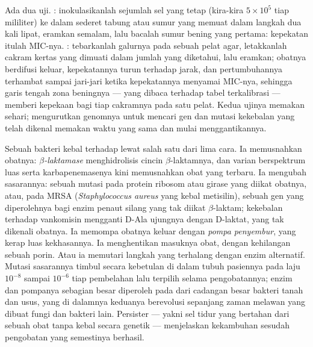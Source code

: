 \begin{method}\label{met:b3:bacteriology:mic}
Ada dua uji. \emph{}: inokulasikanlah sejumlah sel yang tetap
(kira-kira $5\times 10^{5}$ tiap mililiter) ke dalam sederet tabung atau sumur
yang memuat  dalam langkah dua kali lipat, eramkan semalam, lalu
bacalah sumur bening yang pertama: kepekatan itulah MIC-nya. \emph{}: tebarkanlah galurnya pada sebuah pelat agar, letakkanlah cakram kertas
yang dimuati  dalam jumlah yang diketahui, lalu eramkan; obatnya
berdifusi keluar, kepekatannya turun terhadap jarak, dan pertumbuhannya
terhambat sampai jari-jari ketika kepekatannya menyamai MIC-nya, sehingga garis
tengah zona beningnya --- yang dibaca terhadap tabel terkalibrasi --- memberi
kepekaan bagi tiap cakramnya pada satu pelat. Kedua ujinya memakan sehari;
mengurutkan genomnya untuk mencari gen dan mutasi kekebalan yang telah dikenal
memakan waktu yang sama dan mulai menggantikannya.
\end{method}

\begin{definition}[Kekebalan]\label{def:b3:bacteriology:resistance}
Sebuah bakteri kebal terhadap  lewat salah satu dari lima cara. Ia
memusnahkan obatnya: \emph{$\beta$-laktamase} menghidrolisis cincin
$\beta$-laktamnya, dan varian berspektrum luas serta karbapenemasenya kini
memusnahkan obat yang terbaru. Ia mengubah sasarannya: sebuah mutasi pada
protein ribosom atau girase yang diikat obatnya, atau, pada MRSA
(\emph{Staphylococcus aureus} yang kebal metisilin), sebuah gen yang
diperolehnya bagi enzim penaut silang yang tak diikat $\beta$-laktam;
kekebalan terhadap vankomisin mengganti D-Ala ujungnya dengan D-laktat, yang
tak dikenali obatnya. Ia memompa obatnya keluar dengan \emph{pompa penyembur},
yang kerap luas kekhasannya. Ia menghentikan masuknya obat, dengan kehilangan
sebuah porin. Atau ia memutari langkah yang terhalang dengan enzim alternatif.
Mutasi sasarannya timbul secara kebetulan di dalam tubuh pasiennya pada laju
$10^{-8}$ sampai $10^{-6}$ tiap pembelahan lalu terpilih selama pengobatannya;
enzim dan pompanya sebagian besar diperoleh pada  dari cadangan besar
bakteri tanah dan usus, yang di dalamnya keduanya berevolusi sepanjang zaman
melawan  yang dibuat fungi dan bakteri lain. Persister --- yakni sel
tidur yang bertahan dari sebuah obat tanpa kebal secara genetik --- menjelaskan
kekambuhan sesudah pengobatan yang semestinya berhasil.
\end{definition}

